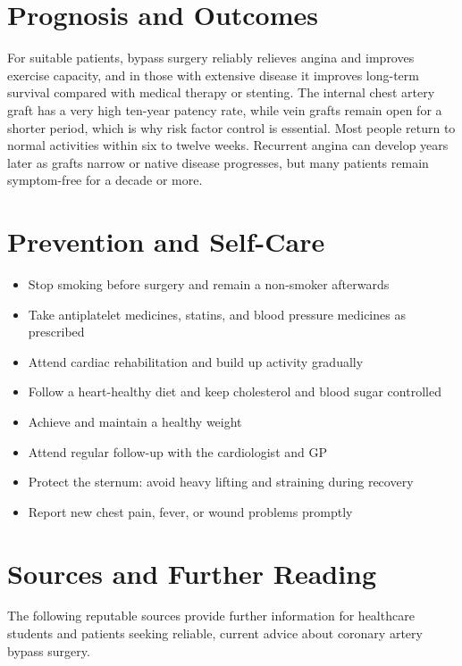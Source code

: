 \section*{Prognosis and Outcomes}
For suitable patients, bypass surgery reliably relieves angina and improves exercise capacity, and in those with extensive disease it improves long-term survival compared with medical therapy or stenting. The internal chest artery graft has a very high ten-year patency rate, while vein grafts remain open for a shorter period, which is why risk factor control is essential. Most people return to normal activities within six to twelve weeks. Recurrent angina can develop years later as grafts narrow or native disease progresses, but many patients remain symptom-free for a decade or more.

\section*{Prevention and Self-Care}
\begin{itemize}
    \item Stop smoking before surgery and remain a non-smoker afterwards
    \item Take antiplatelet medicines, statins, and blood pressure medicines as prescribed
    \item Attend cardiac rehabilitation and build up activity gradually
    \item Follow a heart-healthy diet and keep cholesterol and blood sugar controlled
    \item Achieve and maintain a healthy weight
    \item Attend regular follow-up with the cardiologist and GP
    \item Protect the sternum: avoid heavy lifting and straining during recovery
    \item Report new chest pain, fever, or wound problems promptly
\end{itemize}

\section*{Sources and Further Reading}
The following reputable sources provide further information for healthcare students and patients seeking reliable, current advice about coronary artery bypass surgery.

